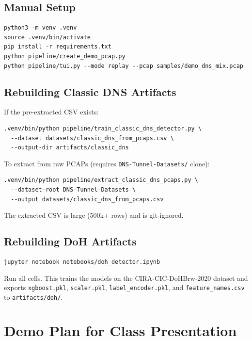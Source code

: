 \documentclass[12pt,a4paper]{article}
\begin{document}
\subsection{Manual Setup}

\begin{lstlisting}
python3 -m venv .venv
source .venv/bin/activate
pip install -r requirements.txt
python pipeline/create_demo_pcap.py
python pipeline/tui.py --mode replay --pcap samples/demo_dns_mix.pcap
\end{lstlisting}

\subsection{Rebuilding Classic DNS Artifacts}

If the pre-extracted CSV exists:
\begin{lstlisting}
.venv/bin/python pipeline/train_classic_dns_detector.py \
  --dataset datasets/classic_dns_from_pcaps.csv \
  --output-dir artifacts/classic_dns
\end{lstlisting}

To extract from raw PCAPs (requires \texttt{DNS-Tunnel-Datasets/} clone):
\begin{lstlisting}
.venv/bin/python pipeline/extract_classic_dns_pcaps.py \
  --dataset-root DNS-Tunnel-Datasets \
  --output datasets/classic_dns_from_pcaps.csv
\end{lstlisting}

The extracted CSV is large (500k+ rows) and is git-ignored.

\subsection{Rebuilding DoH Artifacts}

\begin{lstlisting}
jupyter notebook notebooks/doh_detector.ipynb
\end{lstlisting}

Run all cells. This trains the models on the CIRA-CIC-DoHBrw-2020 dataset and exports \texttt{xgboost.pkl}, \texttt{scaler.pkl}, \texttt{label\_encoder.pkl}, and \texttt{feature\_names.csv} to \texttt{artifacts/doh/}.

\section{Demo Plan for Class Presentation}
\end{document}
